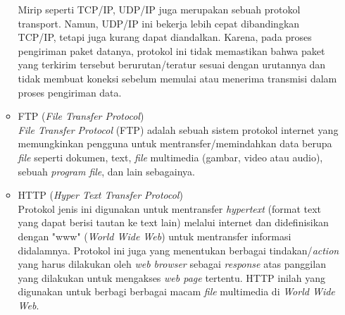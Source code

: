 \documentclass[a4paper]{article}
\begin{document}
\begin{itemize}
\begin{itemize}
        Mirip seperti TCP/IP, UDP/IP juga merupakan sebuah protokol transport. Namun, UDP/IP ini bekerja lebih cepat dibandingkan TCP/IP, tetapi juga kurang dapat diandalkan. Karena, pada proses pengiriman paket datanya, protokol ini tidak memastikan bahwa paket yang terkirim tersebut berurutan/teratur sesuai dengan urutannya dan tidak membuat koneksi sebelum memulai atau menerima transmisi dalam proses pengiriman data\autocite{what-is-internet-protocol}.
        \item FTP (\textit{File Transfer Protocol})\\
        \textit{File Transfer Protocol} (FTP) adalah sebuah sistem protokol internet yang memungkinkan pengguna untuk mentransfer/memindahkan data berupa \textit{file} seperti dokumen, text, \textit{file} multimedia (gambar, video atau audio), sebuah \textit{program file}, dan lain sebagainya\autocite{javatpoint-internet}.
        \item HTTP (\textit{Hyper Text Transfer Protocol})\\
        Protokol jenis ini digunakan untuk mentransfer \textit{hypertext} (format text yang dapat berisi tautan ke text lain) melalui internet dan didefinisikan dengan "www" (\textit{World Wide Web}) untuk mentransfer informasi didalamnya. Protokol ini juga yang menentukan berbagai tindakan/\textit{action} yang harus dilakukan oleh \textit{web browser} sebagai \textit{response} atas panggilan yang dilakukan untuk mengakses \textit{web page} tertentu. HTTP inilah yang digunakan untuk berbagi berbagai macam \textit{file} multimedia di \textit{World Wide Web}\autocite{types-of-internet-protocols}.
    \end{itemize}
\end{itemize}
\end{document}

